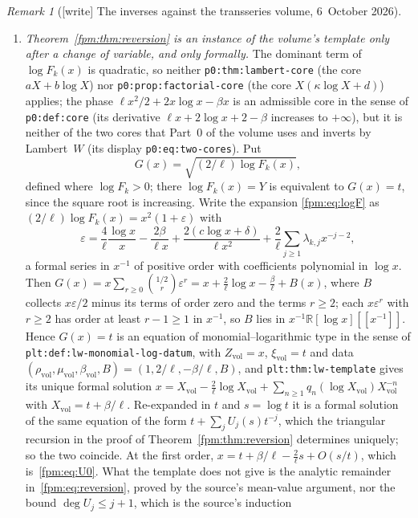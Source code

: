 \documentclass[11pt]{article}
\theoremstyle{definition}\newtheorem{definition}[theorem]{Definition}
\theoremstyle{remark}\newtheorem{remark}[theorem]{Remark}
\newcommand{\file}[1]{\nolinkurl{#1}}
\begin{document}
\begin{remark}[{[write]} The inverses against the transseries volume, 6~October 2026]
\begin{enumerate}[label=(\alph*)]
 $B'$ and $B_{k,J}$ in~\eqref{fpm:eq:ceilingprecise}
 and~\eqref{fpm:eq:ceilingtruncated} are existential; only
 \eqref{fpm:eq:effectiveinverse} is explicit.
\item \emph{Theorem~\ref{fpm:thm:reversion} is an instance of the volume's
 template only after a change of variable, and only formally.} The dominant
 term of $\log F_k(x)$ is quadratic, so neither \file{p0:thm:lambert-core}
 (the core $aX+b\log X$) nor \file{p0:prop:factorial-core} (the core
 $X(\kappa\log X+d)$) applies; the phase $\ell x^2/2+2x\log x-\beta x$ is an
 admissible core in the sense of \file{p0:def:core} (its derivative
 $\ell x+2\log x+2-\beta$ increases to $+\infty$), but it is neither of
 the two cores that Part~0 of the volume uses and inverts by Lambert~$W$
 (its display \file{p0:eq:two-cores}). Put
 \[
  G(x)=\sqrt{(2/\ell)\log F_k(x)},
 \]
 defined where $\log F_k>0$; there $\log F_k(x)=Y$ is equivalent to
 $G(x)=t$, since the square root is increasing. Write the expansion
 \eqref{fpm:eq:logF} as $(2/\ell)\log F_k(x)=x^2(1+\varepsilon)$ with
 \[
  \varepsilon=\frac4\ell\frac{\log x}{x}-\frac{2\beta}{\ell x}
  +\frac{2(c\log x+\delta)}{\ell x^2}+\frac2\ell\sum_{j\ge1}\lambda_{k,j}x^{-j-2},
 \]
 a formal series in $x^{-1}$ of positive order with coefficients polynomial
 in $\log x$. Then
 $G(x)=x\sum_{r\ge0}\binom{1/2}{r}\varepsilon^r
 =x+\frac2\ell\log x-\frac\beta\ell+B(x)$, where $B$ collects $x\varepsilon/2$
 minus its terms of order zero and the terms $r\ge2$; each $x\varepsilon^r$
 with $r\ge2$ has order at least $r-1\ge1$ in $x^{-1}$, so $B$ lies in
 $x^{-1}\mathbb R[\log x][[x^{-1}]]$. Hence $G(x)=t$ is an equation of
 monomial--logarithmic type in the sense of
 \file{plt:def:lw-monomial-log-datum}, with $Z_{\mathrm{vol}}=x$,
 $\xi_{\mathrm{vol}}=t$ and data
 $(\rho_{\mathrm{vol}},\mu_{\mathrm{vol}},\beta_{\mathrm{vol}},B)=(1,2/\ell,-\beta/\ell,B)$,
 and \file{plt:thm:lw-template} gives its unique formal solution
 $x=X_{\mathrm{vol}}-\frac2\ell\log X_{\mathrm{vol}}
 +\sum_{n\ge1}q_n(\log X_{\mathrm{vol}})X_{\mathrm{vol}}^{-n}$ with
 $X_{\mathrm{vol}}=t+\beta/\ell$. Re-expanded in $t$ and $s=\log t$ it is a
 formal solution of the same equation of the form
 $t+\sum_jU_j(s)t^{-j}$, which the triangular recursion in the proof of
 Theorem~\ref{fpm:thm:reversion} determines uniquely; so the two coincide.
 At the first order, $x=t+\beta/\ell-\frac2\ell s+O(s/t)$, which
 is~\eqref{fpm:eq:U0}. What the template does not give is the analytic
 remainder in~\eqref{fpm:eq:reversion}, proved by the source's mean-value
 argument, nor the bound $\deg U_j\le j+1$, which is the source's induction

\end{enumerate}
\end{remark}
\end{document}
